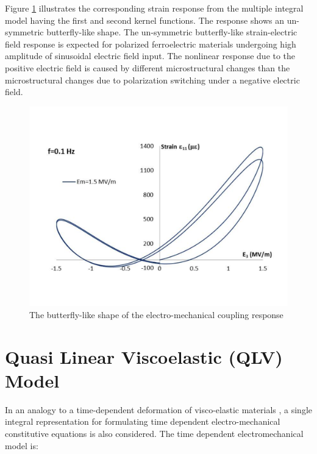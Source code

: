 Figure \ref{fig_3_9_the_butterfly_like_shape_of_the_electro_mechanical_coupling_response} illustrates the corresponding strain response from the multiple integral model
having the first and second kernel functions. The response shows an un-symmetric
butterfly-like shape. The un-symmetric butterfly-like strain-electric field response is
expected for polarized ferroelectric materials undergoing high amplitude of sinusoidal
electric field input. The nonlinear response due to the positive electric field is caused by
different microstructural changes than the microstructural changes due to polarization
switching under a negative electric field. 



\begin{figure}
\centering
\includegraphics[width=5.0in]
{./chap_3_minor_loop/figures/fig_3_9_the_butterfly-like_shape_of_the_electro-mechanical_coupling_response.pdf}
\caption{The butterfly-like shape of the electro-mechanical coupling response}
\label{fig_3_9_the_butterfly_like_shape_of_the_electro_mechanical_coupling_response}
\end{figure}

\section{Quasi Linear Viscoelastic (QLV) Model \cite{sohrabi2015nonlinear}} 
In an analogy to a time-dependent deformation of visco-elastic materials \cite{Wineman2000}, 
a single integral representation for formulating time dependent electro-mechanical constitutive equations is also considered.
The time dependent electromechanical model is:  

